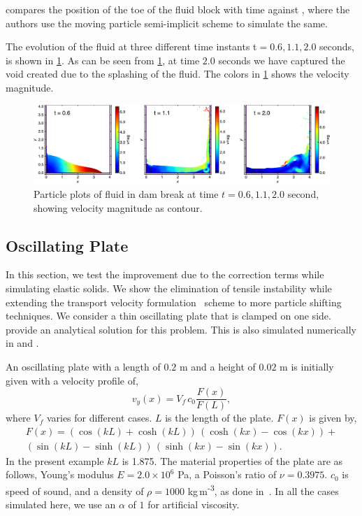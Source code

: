  compares the position of the toe of the fluid block with
time against \citep{koshizuka1996moving}, where the authors use the moving
particle semi-implicit scheme to simulate the same.

The evolution of the fluid at three different time instants t$=0.6, 1.1, 2.0$
seconds, is shown in \cref{fig:dam-break-plots-vmag}. As can be seen from
\cref{fig:dam-break-plots-vmag}, at time $2.0$ seconds we have captured the void
created due to the splashing of the fluid. The colors in
\cref{fig:dam-break-plots-vmag} shows the velocity magnitude.

%
\begin{figure}
  \centering
  \includegraphics[width=\textwidth]{figures/ctvf/figures/dam_break_2d/db2d_vmag}
  \caption{Particle plots of fluid in dam break at time $t=0.6, 1.1, 2.0$
    second, showing velocity magnitude as contour.}
\label{fig:dam-break-plots-vmag}
\end{figure}


\FloatBarrier%
\subsection{Oscillating Plate}
\label{sec:oscillating-plate}
In this section, we test the improvement due to the correction terms while
simulating elastic solids. We show the elimination of tensile instability
while extending the transport velocity formulation~\citep{Adami2013} scheme to
more particle shifting techniques. We consider a thin oscillating
plate that is clamped on one side. \cite{landau1960} provide an analytical
solution for this problem. This is also simulated numerically in
\citep{gray-ed-2001} and \citep{zhang_hu_adams17}.


An oscillating plate with a length of $0.2$ m and a height of $0.02$ m is
initially given with a velocity profile of,
%
\begin{equation*}
  v_y(x) = V_f \, c_0 \frac{F(x)}{F(L)},
\end{equation*}
where $V_f$ varies for different cases. $L$ is the length of the plate. $F(x)$
is given by,
\begin{multline}
  F(x) = (\cos(kL) + \cosh(kL)) \, (\cosh(kx) - \cos(kx)) + \\
  (\sin(kL) - \sinh(kL)) \, (\sinh(kx) - \sin(kx)).
\end{multline}
%
In the present example $kL$ is 1.875. The material properties of the plate are
as follows, Young's modulus $E=2.0\times 10^6$ Pa, a Poisson's ratio of
$\nu=0.3975$. $c_0$ is speed of sound, and a density of $\rho=1000$
kg\,m\textsuperscript{-3}, as done in~\citep{gray-ed-2001}.  In all the cases
simulated here, we use an $\alpha$ of $1$ for artificial viscosity.

